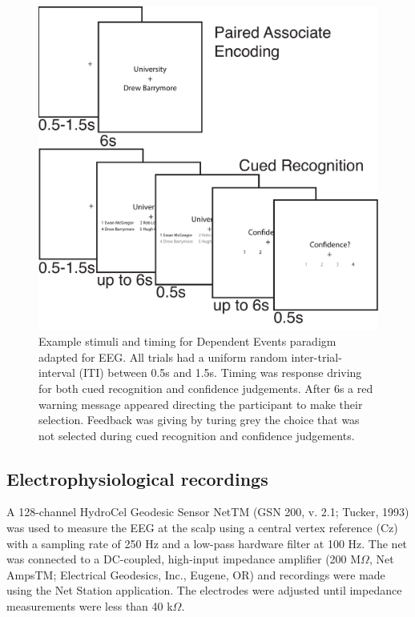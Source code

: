 \documentclass[11pt, titlepage, twoside]{article}
\begin{document}
\begin{figure}
	\includegraphics[width=.5\textwidth]{figs/deevTask.pdf}
	\caption[EEG Dependent Events Task]{
		Example stimuli and timing for Dependent Events paradigm adapted for EEG.  All trials had a uniform random inter-trial-interval (ITI) between 0.5s and 1.5s.  Timing was response driving for both cued recognition and confidence judgements.  After 6s a red warning message appeared directing the participant to make their selection.  Feedback was giving by turing grey the choice that was not selected during cued recognition and confidence judgements.  
	}
	\label{fig:deevTask}
\end{figure}



\subsection{Electrophysiological recordings}
A 128-channel HydroCel Geodesic Sensor NetTM (GSN 200, v. 2.1; Tucker, 1993) was used to measure the EEG at the scalp using a central vertex reference (Cz) with a sampling rate of 250 Hz and a low-pass hardware filter at 100 Hz. The net was connected to a DC-coupled, high-input impedance amplifier (200 M$\Omega$, Net AmpsTM; Electrical Geodesics, Inc., Eugene, OR) and recordings were made using the Net Station application. The electrodes were adjusted until impedance measurements were less than 40 k$\Omega$.
\end{document}
